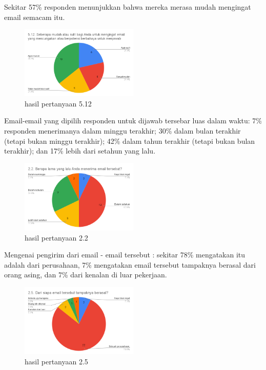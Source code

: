 \documentclass[lettersize,journal]{IEEEtran}
\begin{document}
Sekitar 57\% responden menunjukkan bahwa mereka merasa mudah mengingat email
semacam itu.

\begin{figure}[h!]
  \centering
  \includegraphics[width=0.5\textwidth]{image/5.12.png}
  \caption{hasil pertanyaan 5.12}
  \label{fig:pertanyaan_5.12}
\end{figure}

Email-email yang dipilih responden untuk dijawab tersebar luas dalam waktu: 7\%
responden menerimanya dalam minggu terakhir; 30\% dalam bulan terakhir (tetapi
bukan minggu terakhir); 42\% dalam tahun terakhir (tetapi bukan bulan
terakhir); dan 17\% lebih dari setahun yang lalu.

\begin{figure}[h!]
  \centering
  \includegraphics[width=0.5\textwidth]{image/2.2.png}
  \caption{hasil pertanyaan 2.2}
  \label{fig:pertanyaan_2.2}
\end{figure}

Mengenai pengirim dari email - email tersebut : sekitar 78\% mengatakan itu
adalah dari perusahaan, 7\% mengatakan email tersebut tampaknya berasal dari
orang asing, dan 7\% dari kenalan di luar pekerjaan.

\begin{figure}[h!]
  \centering
  \includegraphics[width=0.5\textwidth]{image/2.5.png}
  \caption{hasil pertanyaan 2.5}
  \label{fig:pertanyaan_2.5}
\end{figure}
\end{document}
